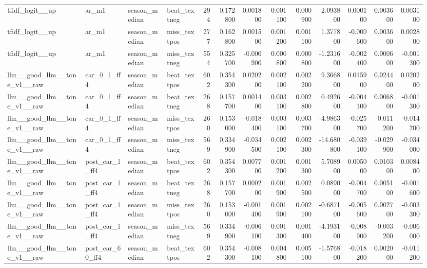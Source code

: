 \begin{table}
\begin{tabular}{llllrrrrrrrrr}
tfidf\_logit\_\_up & ar\_m1 & season\_median & beat\_textneg & 294 & 0.172800 & 0.001800 & 0.001100 & 0.000900 & 2.093800 & 0.000100 & 0.003600 & 0.003100 \\
tfidf\_logit\_\_up & ar\_m1 & season\_median & miss\_textpos & 277 & 0.162800 & 0.001500 & 0.001200 & 0.001100 & 1.377800 & -0.000600 & 0.003600 & 0.002800 \\
tfidf\_logit\_\_up & ar\_m1 & season\_median & miss\_textneg & 554 & 0.325700 & -0.000900 & 0.000800 & 0.000800 & -1.231600 & -0.002400 & 0.000600 & -0.001300 \\
llm\_\_good\_llm\_\_tone\_v1\_\_raw & car\_0\_1\_ff4 & season\_median & beat\_textpos & 602 & 0.354300 & 0.020200 & 0.002100 & 0.002200 & 9.366800 & 0.015900 & 0.024400 & 0.020200 \\
llm\_\_good\_llm\_\_tone\_v1\_\_raw & car\_0\_1\_ff4 & season\_median & beat\_textneg & 268 & 0.157700 & 0.001400 & 0.003100 & 0.002800 & 0.492600 & -0.004100 & 0.006800 & -0.001300 \\
llm\_\_good\_llm\_\_tone\_v1\_\_raw & car\_0\_1\_ff4 & season\_median & miss\_textpos & 260 & 0.153000 & -0.018400 & 0.003100 & 0.003700 & -4.986300 & -0.025700 & -0.011200 & -0.014700 \\
llm\_\_good\_llm\_\_tone\_v1\_\_raw & car\_0\_1\_ff4 & season\_median & miss\_textneg & 569 & 0.334900 & -0.034500 & 0.002100 & 0.002300 & -14.680800 & -0.039100 & -0.029900 & -0.034000 \\
llm\_\_good\_llm\_\_tone\_v1\_\_raw & post\_car\_1\_ff4 & season\_median & beat\_textpos & 602 & 0.354300 & 0.007700 & 0.001200 & 0.001300 & 5.708900 & 0.005000 & 0.010300 & 0.008400 \\
llm\_\_good\_llm\_\_tone\_v1\_\_raw & post\_car\_1\_ff4 & season\_median & beat\_textneg & 268 & 0.157700 & 0.000200 & 0.001900 & 0.002500 & 0.089000 & -0.004700 & 0.005100 & -0.001600 \\
llm\_\_good\_llm\_\_tone\_v1\_\_raw & post\_car\_1\_ff4 & season\_median & miss\_textpos & 260 & 0.153000 & -0.001400 & 0.001900 & 0.002100 & -0.687100 & -0.005600 & 0.002700 & -0.003300 \\
llm\_\_good\_llm\_\_tone\_v1\_\_raw & post\_car\_1\_ff4 & season\_median & miss\_textneg & 569 & 0.334900 & -0.006100 & 0.001300 & 0.001400 & -4.193100 & -0.008900 & -0.003200 & -0.006000 \\
llm\_\_good\_llm\_\_tone\_v1\_\_raw & post\_car\_60\_ff4 & season\_median & beat\_textpos & 602 & 0.354300 & -0.008100 & 0.004800 & 0.005100 & -1.576800 & -0.018200 & 0.002000 & -0.011200 \\

\end{tabular}
\end{table}
